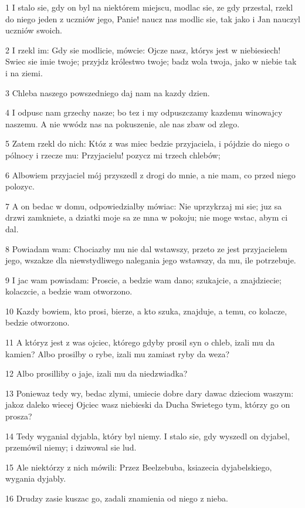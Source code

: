 \par 1 I stalo sie, gdy on byl na niektórem miejscu, modlac sie, ze gdy przestal, rzekl do niego jeden z uczniów jego, Panie! naucz nas modlic sie, tak jako i Jan nauczyl uczniów swoich.
\par 2 I rzekl im: Gdy sie modlicie, mówcie: Ojcze nasz, którys jest w niebiesiech! Swiec sie imie twoje; przyjdz królestwo twoje; badz wola twoja, jako w niebie tak i na ziemi.
\par 3 Chleba naszego powszedniego daj nam na kazdy dzien.
\par 4 I odpusc nam grzechy nasze; bo tez i my odpuszczamy kazdemu winowajcy naszemu. A nie wwódz nas na pokuszenie, ale nas zbaw od zlego.
\par 5 Zatem rzekl do nich: Któz z was miec bedzie przyjaciela, i pójdzie do niego o pólnocy i rzecze mu: Przyjacielu! pozycz mi trzech chlebów;
\par 6 Albowiem przyjaciel mój przyszedl z drogi do mnie, a nie mam, co przed niego polozyc.
\par 7 A on bedac w domu, odpowiedzialby mówiac: Nie uprzykrzaj mi sie; juz sa drzwi zamkniete, a dziatki moje sa ze mna w pokoju; nie moge wstac, abym ci dal.
\par 8 Powiadam wam: Chociazby mu nie dal wstawszy, przeto ze jest przyjacielem jego, wszakze dla niewstydliwego nalegania jego wstawszy, da mu, ile potrzebuje.
\par 9 I jac wam powiadam: Proscie, a bedzie wam dano; szukajcie, a znajdziecie; kolaczcie, a bedzie wam otworzono.
\par 10 Kazdy bowiem, kto prosi, bierze, a kto szuka, znajduje, a temu, co kolacze, bedzie otworzono.
\par 11 A któryz jest z was ojciec, którego gdyby prosil syn o chleb, izali mu da kamien? Albo prosilby o rybe, izali mu zamiast ryby da weza?
\par 12 Albo prosilliby o jaje, izali mu da niedzwiadka?
\par 13 Poniewaz tedy wy, bedac zlymi, umiecie dobre dary dawac dzieciom waszym: jakoz daleko wiecej Ojciec wasz niebieski da Ducha Swietego tym, którzy go on prosza?
\par 14 Tedy wyganial dyjabla, który byl niemy. I stalo sie, gdy wyszedl on dyjabel, przemówil niemy; i dziwowal sie lud.
\par 15 Ale niektórzy z nich mówili: Przez Beelzebuba, ksiazecia dyjabelskiego, wygania dyjably.
\par 16 Drudzy zasie kuszac go, zadali znamienia od niego z nieba.
